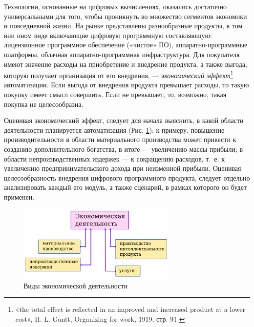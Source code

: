 \documentclass{article}
\begin{document}
Технологии, основанные на цифровых вычислениях, оказались достаточно универсальными для того, чтобы проникнуть во множество сегментов экономики и повседневной жизни. На рынке представлены разнообразные продукты, в том или ином виде включающие цифровую программную составляющую: лицензионное программное обеспечение («чистое» ПО), аппаратно-программные платформы, облачная аппаратно-программная инфраструктура. Для покупателя имеют значение расходы на приобретение и внедрение продукта, а также выгода, которую получает организация от его внедрения, — \textit{экономический эффект}\footnote{«the total effect is reflected in an improved and increased product at a lower cost», H. L. Gantt, Organizing for work, 1919, стр. 91 \cite{ecoEffectOrganizingForWork}} автоматизации. Если выгода от внедрения продукта превышает расходы, то такую покупку имеет смысл совершить. Если не превышает, то, возможно, такая покупка не целесообразна.

Оценивая экономический эффект, следует для начала выяснить, в какой области деятельности планируется автоматизация (Рис. \ref{fig:eco_acts}): к примеру, повышение производительности в области материального производства может привести к созданию дополнительного богатства, в итоге — увеличению массы прибыли; в области непроизводственных издержек — к сокращению расходов, т.~е. к увеличению предпринимательского дохода при неизменной прибыли. Оценивая целесообразность внедрения цифрового программного продукта, следует отдельно анализировать каждый его модуль, а также сценарий, в рамках которого он будет применен.

\begin{figure}[h]
    \centering
    \includegraphics[width=0.70\textwidth]{eco-acts}
    \caption{Виды экономической деятельности}
    \label{fig:eco_acts}
\end{figure}

\end{document}
